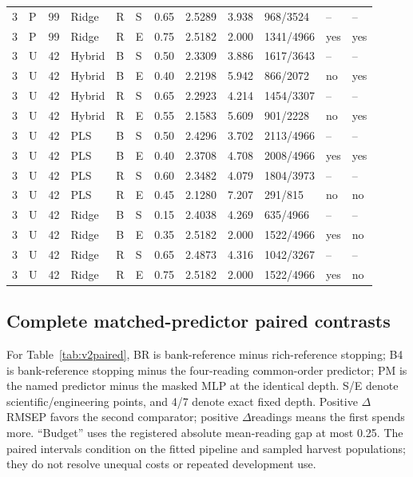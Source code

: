 \documentclass[10pt,a4paper]{article}
\begin{document}
\begin{longtable}{rlrlllrrrlll}
3 & P & 99 & Ridge & R & S & 0.65 & 2.5289 & 3.938 & 968/3524 & -- & -- \\
3 & P & 99 & Ridge & R & E & 0.75 & 2.5182 & 2.000 & 1341/4966 & yes & yes \\
3 & U & 42 & Hybrid & B & S & 0.50 & 2.3309 & 3.886 & 1617/3643 & -- & -- \\
3 & U & 42 & Hybrid & B & E & 0.40 & 2.2198 & 5.942 & 866/2072 & no & yes \\
3 & U & 42 & Hybrid & R & S & 0.65 & 2.2923 & 4.214 & 1454/3307 & -- & -- \\
3 & U & 42 & Hybrid & R & E & 0.55 & 2.1583 & 5.609 & 901/2228 & no & yes \\
3 & U & 42 & PLS & B & S & 0.50 & 2.4296 & 3.702 & 2113/4966 & -- & -- \\
3 & U & 42 & PLS & B & E & 0.40 & 2.3708 & 4.708 & 2008/4966 & yes & yes \\
3 & U & 42 & PLS & R & S & 0.60 & 2.3482 & 4.079 & 1804/3973 & -- & -- \\
3 & U & 42 & PLS & R & E & 0.45 & 2.1280 & 7.207 & 291/815 & no & no \\
3 & U & 42 & Ridge & B & S & 0.15 & 2.4038 & 4.269 & 635/4966 & -- & -- \\
3 & U & 42 & Ridge & B & E & 0.35 & 2.5182 & 2.000 & 1522/4966 & yes & no \\
3 & U & 42 & Ridge & R & S & 0.65 & 2.4873 & 4.316 & 1042/3267 & -- & -- \\
3 & U & 42 & Ridge & R & E & 0.75 & 2.5182 & 2.000 & 1522/4966 & yes & no \\
\end{longtable}
\endgroup

\subsection{Complete matched-predictor paired contrasts}
For Table~\ref{tab:v2paired}, BR is bank-reference minus rich-reference stopping; B4 is bank-reference stopping minus the four-reading common-order predictor; PM is the named predictor minus the masked MLP at the identical depth. S/E denote scientific/engineering points, and 4/7 denote exact fixed depth. Positive $\Delta$RMSEP favors the second comparator; positive $\Delta$readings means the first spends more. ``Budget'' uses the registered absolute mean-reading gap at most 0.25. The paired intervals condition on the fitted pipeline and sampled harvest populations; they do not resolve unequal costs or repeated development use.
\end{document}
